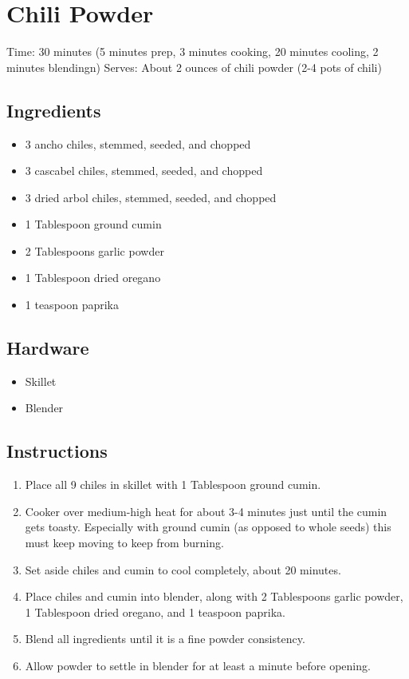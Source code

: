 \section{Chili Powder}
\label{chiliPowder}
\setcounter{secnumdepth}{0}
Time: 30 minutes (5 minutes prep, 3 minutes cooking, 20 minutes cooling, 2 minutes blendingn)
Serves: About 2 ounces of chili powder (2-4 pots of chili)

\begin{multicols}{2}
\subsection*{Ingredients}
\begin{itemize}
    \item 3 ancho chiles, stemmed, seeded, and chopped
    \item 3 cascabel chiles, stemmed, seeded, and chopped
    \item 3 dried arbol chiles, stemmed, seeded, and chopped
    \item 1 Tablespoon ground cumin
    \item 2 Tablespoons garlic powder
    \item 1 Tablespoon dried oregano
    \item 1 teaspoon paprika
\end{itemize}

\subsection*{Hardware}
\begin{itemize}
    \item Skillet
    \item Blender
\end{itemize}
\clearpage

\subsection*{Instructions}
\begin{enumerate}
    \item Place all 9 chiles in skillet with 1 Tablespoon ground cumin.
    \item Cooker over medium-high heat for about 3-4 minutes just until the cumin gets toasty. Especially with ground cumin (as opposed to whole seeds) this must keep moving to keep from burning.
    \item Set aside chiles and cumin to cool completely, about 20 minutes.
    \item Place chiles and cumin into blender, along with 2 Tablespoons garlic powder, 1 Tablespoon dried oregano, and 1 teaspoon paprika.
    \item Blend all ingredients until it is a fine powder consistency.
    \item Allow powder to settle in blender for at least a minute before opening.
\end{enumerate}


\end{multicols}
